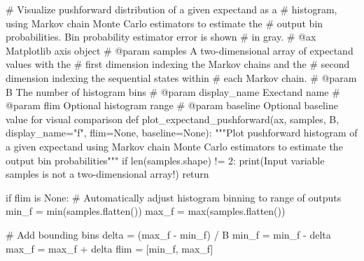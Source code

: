 \documentclass[
  letterpaper,
  DIV=11,
  numbers=noendperiod]{scrartcl}
\newenvironment{Shaded}{\begin{snugshade}}{\end{snugshade}}
\newcommand{\BuiltInTok}[1]{\textcolor[rgb]{0.00,0.23,0.31}{#1}}
\newcommand{\CommentTok}[1]{\textcolor[rgb]{0.37,0.37,0.37}{#1}}
\newcommand{\ControlFlowTok}[1]{\textcolor[rgb]{0.00,0.23,0.31}{#1}}
\newcommand{\DecValTok}[1]{\textcolor[rgb]{0.68,0.00,0.00}{#1}}
\newcommand{\KeywordTok}[1]{\textcolor[rgb]{0.00,0.23,0.31}{#1}}
\newcommand{\NormalTok}[1]{\textcolor[rgb]{0.00,0.23,0.31}{#1}}
\newcommand{\OperatorTok}[1]{\textcolor[rgb]{0.37,0.37,0.37}{#1}}
\newcommand{\StringTok}[1]{\textcolor[rgb]{0.13,0.47,0.30}{#1}}
\newcommand{\VariableTok}[1]{\textcolor[rgb]{0.07,0.07,0.07}{#1}}
\begin{document}
\begin{Shaded}
\begin{Highlighting}[]

\CommentTok{\# Visualize pushforward distribution of a given expectand as a }
\CommentTok{\# histogram, using Markov chain Monte Carlo estimators to estimate the }
\CommentTok{\# output bin probabilities.  Bin probability estimator error is shown }
\CommentTok{\# in gray.}
\CommentTok{\# @ax Matplotlib axis object}
\CommentTok{\# @param samples A two{-}dimensional array of expectand values with the }
\CommentTok{\#                first dimension indexing the Markov chains and the }
\CommentTok{\#                second dimension indexing the sequential states within }
\CommentTok{\#                each Markov chain.}
\CommentTok{\# @param B The number of histogram bins}
\CommentTok{\# @param display\_name Exectand name}
\CommentTok{\# @param flim Optional histogram range}
\CommentTok{\# @param baseline Optional baseline value for visual comparison}
\KeywordTok{def}\NormalTok{ plot\_expectand\_pushforward(ax, samples, B, display\_name}\OperatorTok{=}\StringTok{"f"}\NormalTok{, }
\NormalTok{                               flim}\OperatorTok{=}\VariableTok{None}\NormalTok{, baseline}\OperatorTok{=}\VariableTok{None}\NormalTok{):}
  \CommentTok{"""Plot pushforward histogram of a given expectand using Markov chain}
\CommentTok{     Monte Carlo estimators to estimate the output bin probabilities"""}
  \ControlFlowTok{if} \BuiltInTok{len}\NormalTok{(samples.shape) }\OperatorTok{!=} \DecValTok{2}\NormalTok{:}
    \BuiltInTok{print}\NormalTok{(}\StringTok{\textquotesingle{}Input variable \textasciigrave{}samples\textasciigrave{} is not a two{-}dimensional array!\textquotesingle{}}\NormalTok{)}
    \ControlFlowTok{return}
    
  \ControlFlowTok{if}\NormalTok{ flim }\KeywordTok{is} \VariableTok{None}\NormalTok{:}
    \CommentTok{\# Automatically adjust histogram binning to range of outputs}
\NormalTok{    min\_f }\OperatorTok{=} \BuiltInTok{min}\NormalTok{(samples.flatten())}
\NormalTok{    max\_f }\OperatorTok{=} \BuiltInTok{max}\NormalTok{(samples.flatten())}
    
    \CommentTok{\# Add bounding bins}
\NormalTok{    delta }\OperatorTok{=}\NormalTok{ (max\_f }\OperatorTok{{-}}\NormalTok{ min\_f) }\OperatorTok{/}\NormalTok{ B}
\NormalTok{    min\_f }\OperatorTok{=}\NormalTok{ min\_f }\OperatorTok{{-}}\NormalTok{ delta}
\NormalTok{    max\_f }\OperatorTok{=}\NormalTok{ max\_f }\OperatorTok{+}\NormalTok{ delta}
\NormalTok{    flim }\OperatorTok{=}\NormalTok{ [min\_f, max\_f]}
    

\end{Highlighting}
\end{Shaded}
\end{document}
